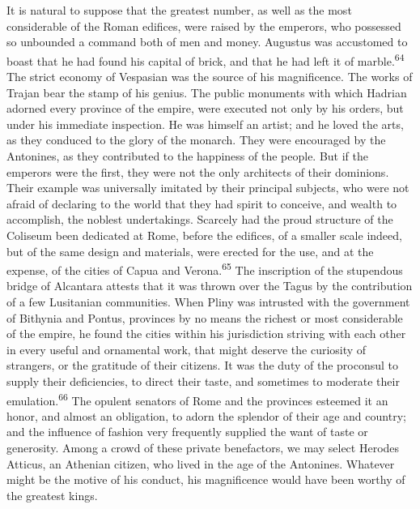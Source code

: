 It is natural to suppose that the greatest number, as well as the
most considerable of the Roman edifices, were raised by the
emperors, who possessed so unbounded a command both of men and
money. Augustus was accustomed to boast that he had found his
capital of brick, and that he had left it of marble.\textsuperscript{64} The
strict economy of Vespasian was the source of his magnificence.
The works of Trajan bear the stamp of his genius. The public
monuments with which Hadrian adorned every province of the
empire, were executed not only by his orders, but under his
immediate inspection. He was himself an artist; and he loved the
arts, as they conduced to the glory of the monarch. They were
encouraged by the Antonines, as they contributed to the happiness
of the people. But if the emperors were the first, they were not
the only architects of their dominions. Their example was
universally imitated by their principal subjects, who were not
afraid of declaring to the world that they had spirit to
conceive, and wealth to accomplish, the noblest undertakings.
Scarcely had the proud structure of the Coliseum been dedicated
at Rome, before the edifices, of a smaller scale indeed, but of
the same design and materials, were erected for the use, and at
the expense, of the cities of Capua and Verona.\textsuperscript{65} The
inscription of the stupendous bridge of Alcantara attests that it
was thrown over the Tagus by the contribution of a few Lusitanian
communities. When Pliny was intrusted with the government of
Bithynia and Pontus, provinces by no means the richest or most
considerable of the empire, he found the cities within his
jurisdiction striving with each other in every useful and
ornamental work, that might deserve the curiosity of strangers,
or the gratitude of their citizens. It was the duty of the
proconsul to supply their deficiencies, to direct their taste,
and sometimes to moderate their emulation.\textsuperscript{66} The opulent
senators of Rome and the provinces esteemed it an honor, and
almost an obligation, to adorn the splendor of their age and
country; and the influence of fashion very frequently supplied
the want of taste or generosity. Among a crowd of these private
benefactors, we may select Herodes Atticus, an Athenian citizen,
who lived in the age of the Antonines. Whatever might be the
motive of his conduct, his magnificence would have been worthy of
the greatest kings.


